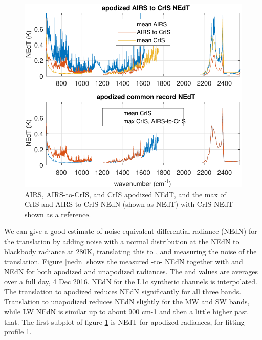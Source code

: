 \documentclass[journal]{IEEEtran}
\begin{document}
\begin{figure} %
  \centering
  \includegraphics[width=\linewidth]{figures/a2cris_nedt.pdf}
  \caption{AIRS, AIRS-to-CrIS, and CrIS apodized NEdT,
    and the max of CrIS and AIRS-to-CrIS NEdN (shown as
    NEdT) with CrIS NEdT shown as a reference.}
  \label{nedt}
\end{figure}

We can give a good estimate of noise equivalent differential
radiance (NEdN) for the translation by adding noise with a normal
distribution at the {\airs} NEdN to blackbody radiance at 280K,
translating this to {\cris}, and measuring the noise of the
translation.  Figure \ref{nedn} shows the measured
{\airs}-to-{\cris} NEdN together with {\airs} and {\cris} NEdN for
both apodized and unapodized radiances.  The {\airs} and {\cris}
values are averages over a full day, 4 Dec 2016.  NEdN for the L1c
synthetic channels is interpolated.  The translation to apodized
{\cris} reduces NEdN significantly for all three bands.  Translation
to unapodized {\cris} reduces NEdN slightly for the MW and SW bands,
while LW NEdN is similar up to about 900 cm-1 and then a little
higher past that.  The first subplot of figure \ref{nedt} is NEdT
for apodized radiances, for fitting profile 1.

\end{document}
